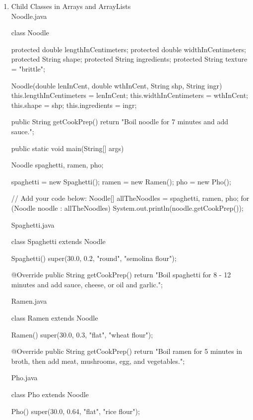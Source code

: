 \documentclass[a4paper,12pt]{article}
\begin{document}
\fontsize{14pt}{15.6pt}
\selectfont

\begin{enumerate}

\item Child Classes in Arrays and ArrayLists\\
Noodle.java
\begin{javacode}
class Noodle {  
  protected double lengthInCentimeters;
  protected double widthInCentimeters;
  protected String shape;
  protected String ingredients;
  protected String texture = "brittle";
  
  Noodle(double lenInCent, double wthInCent, String shp, String ingr) {    
    this.lengthInCentimeters = lenInCent;
    this.widthInCentimeters = wthInCent;
    this.shape = shp;
    this.ingredients = ingr;    
  }
  
  public String getCookPrep() {    
    return "Boil noodle for 7 minutes and add sauce.";    
  }
    
  public static void main(String[] args) {    
    Noodle spaghetti, ramen, pho;
    
    spaghetti = new Spaghetti();
    ramen = new Ramen();
    pho = new Pho();
    
    // Add your code below:
    Noodle[] allTheNoodles = {spaghetti, ramen, pho};
    for (Noodle noodle : allTheNoodles) {
      System.out.println(noodle.getCookPrep());
    }
  }  
}
\end{javacode}

Spaghetti.java
\begin{javacode}
class Spaghetti extends Noodle {  
  Spaghetti() {    
  	super(30.0, 0.2, "round", "semolina flour");    
  }
  
  @Override
  public String getCookPrep() {    
    return "Boil spaghetti for 8 - 12 minutes and add sauce, cheese, or oil and garlic.";    
  }  
}
\end{javacode}

Ramen.java
\begin{javacode}
class Ramen extends Noodle {  
  Ramen() {    
    super(30.0, 0.3, "flat", "wheat flour");    
  }
  
  @Override
  public String getCookPrep() {    
    return "Boil ramen for 5 minutes in broth, then add meat, mushrooms, egg, and vegetables.";    
  }  
}
\end{javacode}

Pho.java
\begin{javacode}
class Pho extends Noodle {  
  Pho() {    
    super(30.0, 0.64, "flat", "rice flour");    
  }
  
}
\end{javacode}
\end{enumerate}
\end{document}
